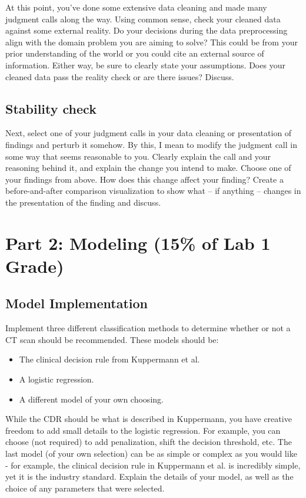 \documentclass[10pt,letterpaper]{article}
\begin{document}
At this point, you’ve done some extensive data cleaning and made many judgment calls along the way. Using common sense, check your cleaned data against some external reality. Do your decisions during the data preprocessing align with the domain problem you are aiming to solve? This could be from your prior understanding of the world or you could cite an external source of information. Either way, be sure to clearly state your assumptions. Does your cleaned data pass the reality check or are there issues? Discuss.

\subsection*{Stability check}

Next, select one of your judgment calls in your data cleaning or presentation of findings and perturb it somehow. By this, I mean to modify the judgment call in some way that seems reasonable to you. Clearly explain the call and your reasoning behind it, and explain the change you intend to make. Choose one of your findings from above. How does this change affect your finding? Create a before-and-after comparison visualization to show what – if anything – changes in the presentation of the finding and discuss.

\section*{Part 2: Modeling (15\% of Lab 1 Grade)}

\subsection*{Model Implementation}

Implement three different classification methods to determine whether or not a CT scan should be recommended. These models should be:
\begin{itemize}
    \item The clinical decision rule from Kuppermann et al.
    \item A logistic regression.
    \item A different model of your own choosing.
\end{itemize}
While the CDR should be what is described in Kuppermann, you have creative freedom to add small details to the logistic regression. For example, you can choose (not required) to add penalization, shift the decision threshold, etc.
%
The last model (of your own selection) can be as simple or complex as you would like - for example, the clinical decision rule in Kuppermann et al. is incredibly simple, yet it is the industry standard. Explain the details of your model, as well as the choice of any parameters that were selected.
\end{document}
